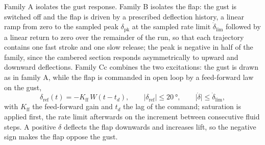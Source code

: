 Family A isolates the gust response. Family B isolates the flap: the gust is switched off and the flap is driven by a prescribed deflection history, a linear ramp from zero to the sampled peak $\delta_{\mathrm{pk}}$ at the sampled rate limit $\dot\delta_{\mathrm{lim}}$ followed by a linear return to zero over the remainder of the run, so that each trajectory contains one fast stroke and one slow release; the peak is negative in half of the family, since the cambered section responds asymmetrically to upward and downward deflections. Family Cc combines the two excitations: the gust is drawn as in family A, while the flap is commanded in open loop by a feed-forward law on the gust,
\[
\delta_{\mathrm{ref}}(t) = -K_{\mathrm{ff}}\,W(t - t_d),
\qquad
\lvert\delta_{\mathrm{ref}}\rvert \le \SI{20}{\degree},
\qquad
\lvert\dot\delta\rvert \le \dot\delta_{\mathrm{lim}},
\]
with $K_{\mathrm{ff}}$ the feed-forward gain and $t_d$ the lag of the command; saturation is applied first, the rate limit afterwards on the increment between consecutive fluid steps. A positive $\delta$ deflects the flap downwards and increases lift, so the negative sign makes the flap oppose the gust.


